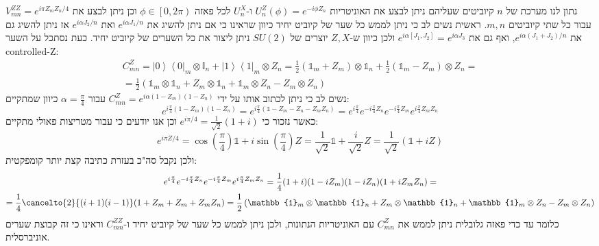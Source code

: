 \documentclass{tstextbook}
\begin{document}
\begin{example}
נתון לנו מערכת של \(n\) קיוביטים שעליהם ניתן לבצע את האוניטריות \(U_{n}^{Z}\left( \phi \right)=e^{ -i\phi Z_{n} }\) ו-\(U_{n}^{X}\) לכל פאזה \(\phi \in \left[ 0,2\pi \right)\) וכן ניתן לבצע את \(V_{mn}^{Z Z}=e^{ i\pi Z_{m}Z_{n}/4 }\) עבור כל שתי קיוביטים \(m,n\). ראשית נשים לב כי ניתן לממש כל שער של קיוביט יחיד כיוון שראינו כי אם ניתן להשיג את \(e^{ i\alpha J_{1}/n  }\) ואת \(e^{ i\alpha J_{2}/n }\) אז ניתן להשיג גם את \(e^{ i\alpha(J_{1}+J_{2})/n }\), ואף גם את \(e^{ i\alpha [J_{1},J_{2}] }=e^{ i\alpha J_{3} }\) ולכן כיוון ש-\(Z,X\) יוצרים של \(SU(2)\) ניתן ליצור את כל השערים של קיוביט יחיד. כעת נסתכל על השער controlled-Z:
\begin{gather*}C_{m n}^{Z}=\left|0\right\rangle\left\langle0\right|_{m}\otimes\mathbb{I}_{n}+\left|1\right\rangle\left\langle1\right|_{m}\otimes Z_{n}=\frac{1}{2}\left( \mathbb{1}_{m} +Z_{m} \right)\otimes \mathbb{1}_{n} +\frac{1}{2}\left( \mathbb{1}_{m} -Z_{m} \right)\otimes Z_{n} = \\=\frac{1}{2}\left( \mathbb{1}_{m} \otimes \mathbb{1} _{n} +Z_{m}\otimes \mathbb{1} _{n}+\mathbb{1} _{m}\otimes Z_{n}-Z_{m}\otimes Z_{n} \right)
\end{gather*}
נשים לב כי ניתן לכתוב אותו על ידי \(C_{mn}^{Z}=e^{ i\alpha(1-Z_{m})(1-Z_{n}) }\) עבור \(\alpha=\frac{\pi}{4}\) כיוון שמתקיים:
$$e^{ i\frac{\pi}{4}(1-Z_{m})(1-Z_{n}) }=e^{ i\frac{\pi}{4} \left( \mathbb{1} -Z_{m} -Z_{n}-Z_{m}Z_{n}\right)}=e^{ i\frac{\pi}{4} }e^{ -i\frac{\pi}{4} Z_{n} }e^{ -i\frac{\pi}{4}Z_{m} }e^{ i\frac{\pi}{4} Z_{m}Z_{n} }$$
כאשר נזכור כי \(e^{ i\pi/4 }=\frac{1}{\sqrt{ 2 }}(1+i)\) וכן אנו יודעים כי עבור מטריצות פאולי מתקיים:
$$e^{ i\pi Z/4 }=\cos\left( \frac{\pi}{4} \right)\mathbb{1} +i\sin\left( \frac{\pi}{4} \right)Z=\frac{1}{\sqrt{ 2 }}\mathbb{1} +\frac{i}{\sqrt{ 2 }}Z=\frac{1}{\sqrt{ 2 }}\left( \mathbb{1} +iZ \right)$$
ולכן נקבל סה"כ בעזרת כתיבה קצת יותר קומפקטית:
\begin{gather*}e^{ i\frac{\pi}{4} }e^{ -i\frac{\pi}{4} Z_{n} }e^{ -i\frac{\pi}{4}Z_{m} }e^{ i\frac{\pi}{4} Z_{m}Z_{n} }=\frac{1}{4}(1+i)(1-iZ_{m})(1-iZ_{n})(1+iZ_{m}Z_{n})=  \\=\frac{1}{4}\cancelto{ 2 }{ (i+1)(i-1) }(1+Z_{m}+Z_{m}+Z_{m}Z_{n})=\frac{1}{2}\left( \mathbb{1}_{m} \otimes \mathbb{1} _{n} +Z_{m}\otimes \mathbb{1} _{n}+\mathbb{1} _{m}\otimes Z_{n}-Z_{m}\otimes Z_{n} \right)
\end{gather*}
כלומר עד כדי פאזה גלובלית ניתן לממש את \(C_{mn}^{Z}\) עם האוניטריות הנתונות, ולכן ניתן לממש כל שער של קיוביט יחיד ו-\(C_{mn}^{Z Z}\) וראינו כי זה קבוצת שערים אוניברסלית.

\end{example}
\end{document}
